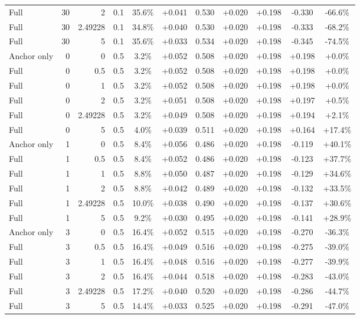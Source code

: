 \begin{table}[htbp]
\begin{tabular}{lrrrccccccc}
Full & 30 & 2 & 0.1 & 35.6\% & +0.041 & 0.530 & +0.020 & +0.198 & -0.330 & -66.6\% \\
Full & 30 & 2.49228 & 0.1 & 34.8\% & +0.040 & 0.530 & +0.020 & +0.198 & -0.333 & -68.2\% \\
Full & 30 & 5 & 0.1 & 35.6\% & +0.033 & 0.534 & +0.020 & +0.198 & -0.345 & -74.5\% \\
Anchor only & 0 & 0 & 0.5 & 3.2\% & +0.052 & 0.508 & +0.020 & +0.198 & +0.198 & +0.0\% \\
Full & 0 & 0.5 & 0.5 & 3.2\% & +0.052 & 0.508 & +0.020 & +0.198 & +0.198 & +0.0\% \\
Full & 0 & 1 & 0.5 & 3.2\% & +0.052 & 0.508 & +0.020 & +0.198 & +0.198 & +0.0\% \\
Full & 0 & 2 & 0.5 & 3.2\% & +0.051 & 0.508 & +0.020 & +0.198 & +0.197 & +0.5\% \\
Full & 0 & 2.49228 & 0.5 & 3.2\% & +0.049 & 0.508 & +0.020 & +0.198 & +0.194 & +2.1\% \\
Full & 0 & 5 & 0.5 & 4.0\% & +0.039 & 0.511 & +0.020 & +0.198 & +0.164 & +17.4\% \\
Anchor only & 1 & 0 & 0.5 & 8.4\% & +0.056 & 0.486 & +0.020 & +0.198 & -0.119 & +40.1\% \\
Full & 1 & 0.5 & 0.5 & 8.4\% & +0.052 & 0.486 & +0.020 & +0.198 & -0.123 & +37.7\% \\
Full & 1 & 1 & 0.5 & 8.8\% & +0.050 & 0.487 & +0.020 & +0.198 & -0.129 & +34.6\% \\
Full & 1 & 2 & 0.5 & 8.8\% & +0.042 & 0.489 & +0.020 & +0.198 & -0.132 & +33.5\% \\
Full & 1 & 2.49228 & 0.5 & 10.0\% & +0.038 & 0.490 & +0.020 & +0.198 & -0.137 & +30.6\% \\
Full & 1 & 5 & 0.5 & 9.2\% & +0.030 & 0.495 & +0.020 & +0.198 & -0.141 & +28.9\% \\
Anchor only & 3 & 0 & 0.5 & 16.4\% & +0.052 & 0.515 & +0.020 & +0.198 & -0.270 & -36.3\% \\
Full & 3 & 0.5 & 0.5 & 16.4\% & +0.049 & 0.516 & +0.020 & +0.198 & -0.275 & -39.0\% \\
Full & 3 & 1 & 0.5 & 16.4\% & +0.048 & 0.516 & +0.020 & +0.198 & -0.277 & -39.9\% \\
Full & 3 & 2 & 0.5 & 16.4\% & +0.044 & 0.518 & +0.020 & +0.198 & -0.283 & -43.0\% \\
Full & 3 & 2.49228 & 0.5 & 17.2\% & +0.040 & 0.520 & +0.020 & +0.198 & -0.286 & -44.7\% \\
Full & 3 & 5 & 0.5 & 14.4\% & +0.033 & 0.525 & +0.020 & +0.198 & -0.291 & -47.0\% \\

\end{tabular}
\end{table}
